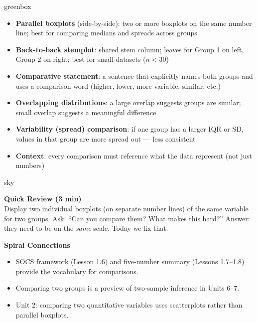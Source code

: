 \documentclass[10pt]{article}
\begin{document}
\boxguard
\begin{skillbox}{greenbox}
\begin{minipage}[t]{0.48\linewidth}
    \begin{itemize}
        \item \textbf{Parallel boxplots} (side-by-side): two or more boxplots on the same number line; best for comparing medians and spreads across groups
        \item \textbf{Back-to-back stemplot}: shared stem column; leaves for Group 1 on left, Group 2 on right; best for small datasets ($n < 30$)
        \item \textbf{Comparative statement}: a sentence that explicitly names both groups and uses a comparison word (higher, lower, more variable, similar, etc.)
    \end{itemize}
\end{minipage}
\hfill
\begin{minipage}[t]{0.48\linewidth}
    \begin{itemize}
        \item \textbf{Overlapping distributions}: a large overlap suggests groups are similar; small overlap suggests a meaningful difference
        \item \textbf{Variability (spread) comparison}: if one group has a larger IQR or SD, values in that group are more spread out --- less consistent
        \item \textbf{Context}: every comparison must reference what the data represent (not just numbers)
    \end{itemize}
\end{minipage}
\end{skillbox}

\boxguard
\begin{skillbox}{sky}
\begin{minipage}[t]{0.48\linewidth}
    \textbf{Quick Review (3 min)}\\
    Display two individual boxplots (on separate number lines) of the same variable for two groups. Ask: ``Can you compare them? What makes this hard?'' Answer: they need to be on the \textit{same} scale. Today we fix that.
\end{minipage}
\hfill
\begin{minipage}[t]{0.48\linewidth}
    \textbf{Spiral Connections}
    \begin{itemize}
        \item SOCS framework (Lesson 1.6) and five-number summary (Lessons 1.7--1.8) provide the vocabulary for comparisons.
        \item Comparing two groups is a preview of two-sample inference in Units 6--7.
        \item Unit 2: comparing two quantitative variables uses scatterplots rather than parallel boxplots.
    \end{itemize}
\end{minipage}
\end{skillbox}
\end{document}
